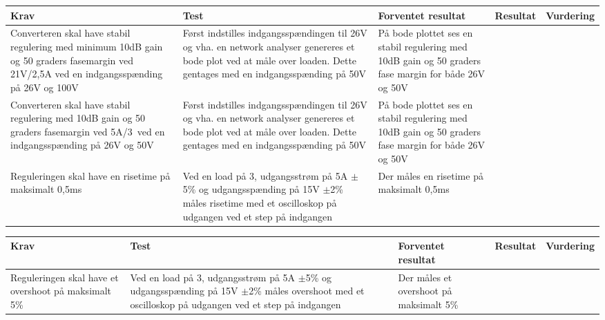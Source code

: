 \begin{tabularx}{\textwidth}{|X|X|X|X|X|}
	\hline
	\textbf{Krav} & \textbf{Test} & \textbf{Forventet resultat} & \textbf{Resultat} & \textbf{Vurdering} \\ \hline
	Converteren skal have stabil regulering med minimum 10dB gain og 50 graders fasemargin ved 21V/2,5A ved en indgangsspænding på 26V og 100V & Først indstilles indgangsspændingen til 26V og vha. en network analyser genereres et bode plot ved at måle over loaden. Dette gentages med en indgangsspænding på 50V & På bode plottet ses en stabil regulering med 10dB gain og 50 graders fase margin for både 26V og 50V && \\ \hline
	Converteren skal have stabil regulering med 10dB gain og 50 graders fasemargin ved 5A/3\ohm\ ved en indgangsspænding på 26V og 50V & Først indstilles indgangsspændingen til 26V og vha. en network analyser genereres et bode plot ved at måle over loaden. Dette gentages med en indgangsspænding på 50V & På bode plottet ses en stabil regulering med 10dB gain og 50 graders fase margin for både 26V og 50V && \\ \hline
	Reguleringen skal have en risetime på maksimalt 0,5ms & Ved en load på 3\ohm, udgangsstrøm på 5A $\pm$5\% og udgangsspænding på 15V $\pm$2\% måles risetime med et oscilloskop på udgangen ved et step på indgangen & Der måles en risetime på maksimalt 0,5ms && \\ \hline
\end{tabularx}


\begin{tabularx}{\textwidth}{|X|X|X|X|X|}
	\hline
	\textbf{Krav} & \textbf{Test} & \textbf{Forventet resultat} & \textbf{Resultat} & \textbf{Vurdering} \\ \hline
	Reguleringen skal have et overshoot på maksimalt 5\% & Ved en load på 3\ohm, udgangsstrøm på 5A $\pm$5\% og udgangsspænding på 15V $\pm$2\% måles overshoot med et oscilloskop på udgangen ved et step på indgangen & Der måles et overshoot på maksimalt 5\% && \\ \hline
\end{tabularx}